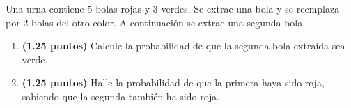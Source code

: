
Una urna contiene 5 bolas rojas y 3 verdes. Se extrae una bola y se reemplaza por 2 bolas del otro color. A continuación se extrae una segunda bola.
\begin{enumerate}[label=\alph*)]
\item \textbf{(1.25 puntos)} Calcule la probabilidad de que la segunda bola extraída sea verde.
\item \textbf{(1.25 puntos)} Halle la probabilidad de que la primera haya sido roja, sabiendo que la segunda también ha sido roja.
\end{enumerate}
